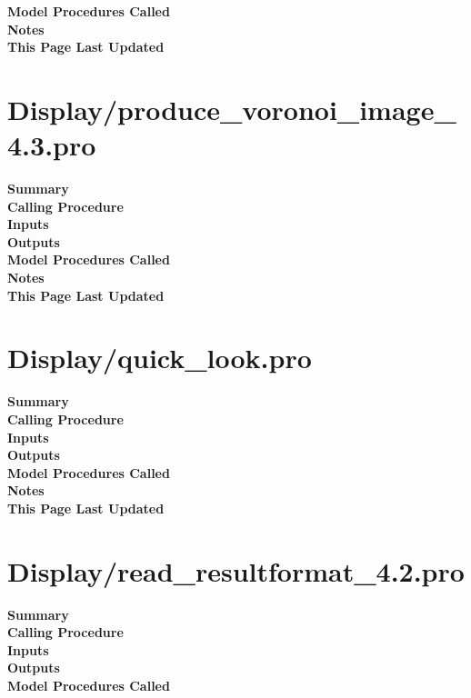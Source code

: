 \documentclass[11pt]{article}
\newcommand\descrip[1]{\textsf{\textbf{\large{#1}}}\\}
\begin{document}
\descrip{Model Procedures Called}

\descrip{Notes}

\descrip{This Page Last Updated}

\clearpage

\section{Display/produce\_voronoi\_image\_4.3.pro}
\label{sec:produce_voronoi_image}

\descrip{Summary}

\descrip{Calling Procedure}

\descrip{Inputs}

\descrip{Outputs}

\descrip{Model Procedures Called}

\descrip{Notes}

\descrip{This Page Last Updated}

\clearpage

\section{Display/quick\_look.pro} \label{sec:quick_look}

\descrip{Summary}

\descrip{Calling Procedure}

\descrip{Inputs}

\descrip{Outputs}

\descrip{Model Procedures Called}

\descrip{Notes}

\descrip{This Page Last Updated}

\clearpage

\section{Display/read\_resultformat\_4.2.pro} \label{sec:read_resultformat}

\descrip{Summary}

\descrip{Calling Procedure}

\descrip{Inputs}

\descrip{Outputs}

\descrip{Model Procedures Called}
\end{document}
